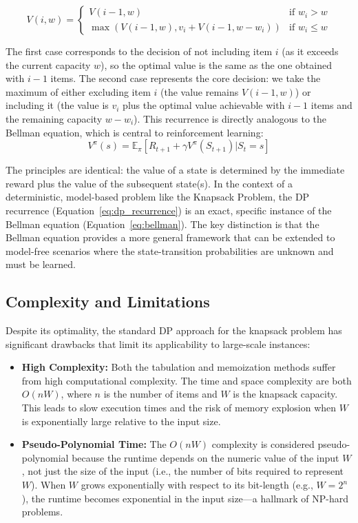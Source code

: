 \begin{equation}
\label{eq:dp_recurrence}
V(i, w) = 
\begin{cases} 
V(i-1, w) & \text{if } w_i > w \\
\max(V(i-1, w), v_i + V(i-1, w - w_i)) & \text{if } w_i \leq w 
\end{cases}
\end{equation}

The first case corresponds to the decision of not including item \(i\) (as it exceeds the current capacity \(w\)), so the optimal value is the same as the one obtained with \(i-1\) items.
The second case represents the core decision: we take the maximum of either excluding item \(i\) (the value remains \(V(i-1, w)\)) or including it (the value is \(v_i\) plus the optimal value achievable with \(i-1\) items and the remaining capacity \(w - w_i\)).
This recurrence is directly analogous to the Bellman equation, which is central to reinforcement learning:
\begin{equation}
\label{eq:bellman}
V^{\pi}(s) = \mathbb{E}_{\pi} [R_{t+1} + \gamma V^{\pi}(S_{t+1}) | S_t = s]
\end{equation}

The principles are identical: the value of a state is determined by the immediate reward plus the value of the subsequent state(s).
In the context of a deterministic, model-based problem like the Knapsack Problem, the DP recurrence (Equation~\ref{eq:dp_recurrence}) is an exact, specific instance of the Bellman equation (Equation~\ref{eq:bellman}).
The key distinction is that the Bellman equation provides a more general framework that can be extended to model-free scenarios where the state-transition probabilities are unknown and must be learned.

\subsection{Complexity and Limitations}

Despite its optimality, the standard DP approach for the knapsack problem has significant drawbacks that limit its applicability to large-scale instances:

\begin{itemize}
    \item \textbf{High Complexity:} Both the tabulation and memoization methods suffer from high computational complexity.
The time and space complexity are both \(O(nW)\), where \(n\) is the number of items and \(W\) is the knapsack capacity.
This leads to slow execution times and the risk of memory explosion when \(W\) is exponentially large relative to the input size.
\item \textbf{Pseudo-Polynomial Time:} The \(O(nW)\) complexity is considered pseudo-polynomial because the runtime depends on the numeric value of the input \(W\), not just the size of the input (i.e., the number of bits required to represent \(W\)).
When \(W\) grows exponentially with respect to its bit-length (e.g., \(W=2^n\)), the runtime becomes exponential in the input size---a hallmark of NP-hard problems.
\end{itemize}

